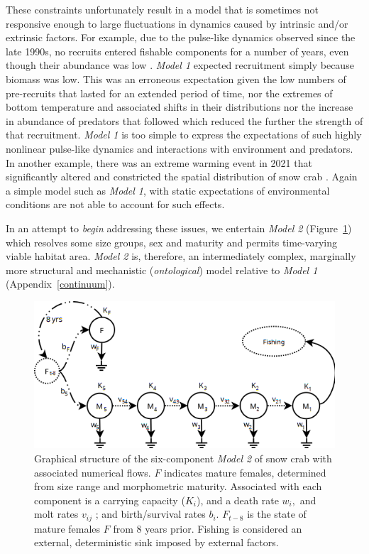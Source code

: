 \documentclass[
	letterpaper, %
	10pt, %
]{article}
\begin{document}
These constraints unfortunately result in a model that is sometimes
not responsive enough to large fluctuations in dynamics caused by
intrinsic and/or extrinsic factors. For example, due to the pulse-like
dynamics observed since the late 1990s, no recruits entered fishable
components for a number of years, even though their abundance was
low \cite{Choi_2011}.
\emph{Model 1} expected recruitment simply because biomass was low. This
was an erroneous expectation given the low numbers of pre-recruits
that lasted for an extended period of time, nor the extremes of bottom
temperature and associated shifts in their distributions nor the increase
in abundance of predators that followed which reduced the further
the strength of that recruitment. \emph{Model 1} is too simple to express
the expectations of such highly nonlinear pulse-like dynamics and
interactions with environment and predators. In another example, there
was an extreme warming event in 2021 that significantly altered and
constricted the spatial distribution of snow crab \cite{Choi_et_al_2022}.
Again a simple model such as \emph{Model 1}, with static expectations of
environmental conditions are not able to account for such effects.

In an attempt to \emph{begin} addressing these issues, we entertain
\emph{Model 2} (Figure~\ref{fig4}) which resolves some size groups, sex and
maturity and permits time-varying viable habitat area. \emph{Model 2} is,
therefore, an intermediately complex, marginally more structural and
mechanistic (\emph{ontological}) model relative to \emph{Model 1} (Appendix~\ref{continuum}).

\begin{figure}
\includegraphics[width=10.5 cm]{media/delay_differential_diagram.png}
\caption{Graphical structure of the six-component \emph{Model 2} of snow
crab with associated numerical flows. 
$F$ indicates mature females, determined from size range and morphometric
maturity. Associated with each component is a carrying capacity ($K_{i}$), and a death rate 
$w_{i},$ and molt rates $v_{\mathit{ij}}$ ; and birth/survival rates 
$b_{i}$. $F_{t-8}$ is the state of mature females $F$ from 8 years prior. Fishing is considered an external, deterministic sink imposed by external factors.} 
\label{fig4}
\end{figure}   
	
\end{document}
